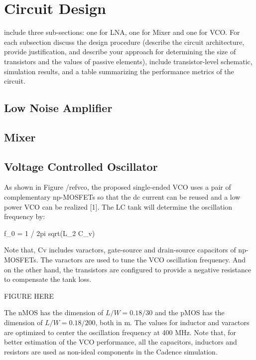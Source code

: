 \section{Circuit Design}
include three sub-sections: one for LNA, one for Mixer and one for VCO. For each subsection discuss the design procedure (describe the circuit architecture, provide justification, and describe your approach for determining the size of transistors and the values of passive elements), include transistor-level schematic, simulation results, and a table summarizing the performance metrics of the circuit.

\subsection{Low Noise Amplifier}

\subsection{Mixer}

\subsection{Voltage Controlled Oscillator}
As shown in Figure /ref{vco}, the proposed single-ended VCO uses a pair of complementary np-MOSFETs so that the dc current can be reused and a low power VCO can be realized [1]. The LC tank will determine the oscillation frequency by:

f_0 = 1 / 2pi sqrt(L_2 C_v)

Note that, Cv includes varactors, gate-source and drain-source capacitors of np-MOSFETs. The varactors are used to tune the VCO oscillation frequency. And on the other hand, the transistors are configured to provide a negative resistance to compensate the tank loss. 

FIGURE HERE

The nMOS has the dimension of $L/W=0.18/30$ and the pMOS has the dimension of $L/W=0.18/200$, both in m. The values for inductor and varactors are optimized to center the oscillation frequency at 400 MHz. Note that, for better estimation of the VCO performance, all the capacitors, inductors and resistors are used as non-ideal components in the Cadence simulation. 

